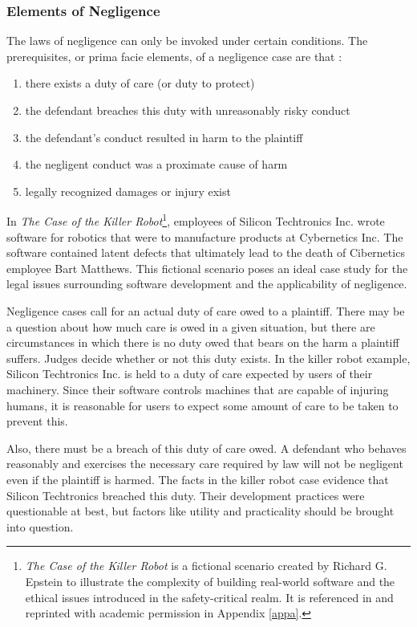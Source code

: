 \documentclass[12pt]{report}
\begin{document}
\subsubsection{Elements of Negligence} 
The laws of negligence can only be invoked under certain conditions. The prerequisites, or prima facie elements, of a negligence case are that \cite{Dobbs01}: 
\singlespace 
\begin{enumerate} 
\item there exists a duty of care (or duty to protect) 
\item the defendant breaches this duty with unreasonably risky conduct 
\item the defendant's conduct resulted in harm to the plaintiff 
\item the negligent conduct was a proximate cause of harm 
\item legally recognized damages or injury exist 
\end{enumerate} 
\doublespace 
In \textit{The Case of the Killer Robot}\footnote{\textit{The Case of the Killer Robot} is a fictional scenario created by Richard G. Epstein to illustrate the complexity of building real-world software and the ethical issues introduced in the safety-critical realm. It is referenced in \cite{Epstein96} and reprinted with academic permission in Appendix \ref{appa}.}, employees of Silicon Techtronics Inc. wrote software for robotics that were to manufacture products at Cybernetics Inc. The software contained latent defects that ultimately lead to the death of Cibernetics employee Bart Matthews. This fictional scenario poses an ideal case study for the legal issues surrounding software development and the applicability of negligence. 

Negligence cases call for an actual duty of care owed to a plaintiff. There may be a question about how much care is owed in a given situation, but there are circumstances in which there is no duty owed that bears on the harm a plaintiff suffers. Judges decide whether or not this duty exists. In the killer robot example, Silicon Techtronics Inc. is held to a duty of care expected by users of their machinery. Since their software controls machines that are capable of injuring humans, it is reasonable for users to expect some amount of care to be taken to prevent this. 

Also, there must be a breach of this duty of care owed. A defendant who behaves reasonably and exercises the necessary care required by law will not be negligent even if the plaintiff is harmed. The facts in the killer robot case evidence that Silicon Techtronics breached this duty. Their development practices were questionable at best, but factors like utility and practicality should be brought into question. 
\end{document}

